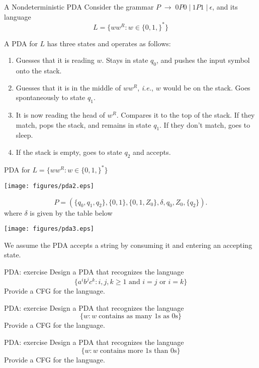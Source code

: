 \documentclass{prosper}%
\newcommand{\e} {{\mbox{$\epsilon$}}}
\newcommand{\ra}{\mbox{$\;\rightarrow\;$}}
\newcommand{\vb}{\mbox{$\;|\:$}}
\begin{document}
\begin{slide}{A Nondeterministic PDA}
Consider the grammar $P\ra 0P0\vb1P1\vb \e$, and its language \[
L=\{ww^R:w\in\{0,1,\}^*\}\] 

A PDA for $L$ has three states and operates as follows:
\begin{enumerate}
\item Guesses that it is reading $w$. Stays in state $q_0$, and pushes the input symbol onto the stack. 
\item  Guesses that it is in the middle of $ww^R$, {\em i.e.}, $w$ would be on the stack. Goes spontaneously to state $q_1$. 
\item It is  now reading the head of $w^R$. Compares it to the top of the stack. If they match, pops the stack, and remains in state $q_1$. 
If they don't match, goes to sleep. 
\item If the stack is empty, goes to state $q_2$ and accepts. 
\end{enumerate}
\end{slide}



\begin{slide}{PDA for $L=\{ww^R:w\in\{0,1,\}^*\}$}
\begin{center}
\texttt{[image: figures/pda2.eps]}
\end{center}

\[
P=(\{q_0, q_1, q_2\}, \{0,1\}, \{0, 1, Z_0\}, \delta, q_0, Z_0, \{q_2\}).
\] where $\delta$ is given by the table below
\begin{center}
\texttt{[image: figures/pda3.eps]}
\end{center}
We assume the PDA accepts a string by consuming it and entering an accepting state.
\end{slide}

\begin{slide}{PDA: exercise}
Design a PDA that recognizes the language
\[
\{a^ib^jc^k:i,j,k\geq 1\mbox{ and }i=j\mbox{ or }i=k\}
\]
Provide a CFG for the language.
\end{slide}

\begin{slide}{PDA: exercise}
Design a PDA that recognizes the language
\[
\{w: w\; \mbox{contains as many 1s as 0s}\}
\]
Provide a CFG for the language.
\end{slide}

\begin{slide}{PDA: exercise}
Design a PDA that recognizes the language
\[
\{w: w\; \mbox{contains more 1s than 0s}\}
\]
Provide a CFG for the language.
\end{slide}
\end{document}
